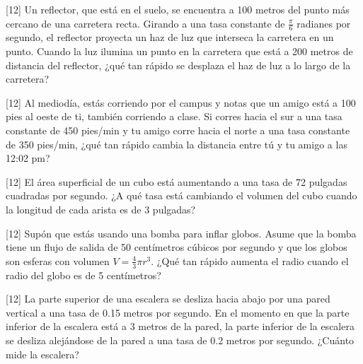 \documentclass[11pt,paper=a4,answers, addpoints]{exam}
\begin{document}
\begin{questions}
[12\half]
Un reflector, que está en el suelo, se encuentra a 100 metros del punto más cercano de una carretera recta. Girando a una tasa constante de $\frac{\pi}{6}$ radianes por segundo, el reflector proyecta un haz de luz que interseca la carretera en un punto. Cuando la luz ilumina un punto en la carretera que está a 200 metros de distancia del reflector, ¿qué tan rápido se desplaza el haz de luz a lo largo de la carretera?

[12\half]
Al mediodía, estás corriendo por el campus y notas que un amigo está a 100 pies al oeste de ti, también corriendo a clase. Si corres hacia el sur a una tasa constante de 450 pies/min y tu amigo corre hacia el norte a una tasa constante de 350 pies/min, ¿qué tan rápido cambia la distancia entre tú y tu amigo a las 12:02 pm?

[12\half]
El área superficial de un cubo está aumentando a una tasa de 72 pulgadas cuadradas por segundo. ¿A qué tasa está cambiando el volumen del cubo cuando la longitud de cada arista es de 3 pulgadas?

[12\half]
Supón que estás usando una bomba para inflar globos. Asume que la bomba tiene un flujo de salida de 50 centímetros cúbicos por segundo y que los globos son esferas con volumen $V=\frac{4}{3}\pi r^3$. ¿Qué tan rápido aumenta el radio cuando el radio del globo es de 5 centímetros?

[12\half]
La parte superior de una escalera se desliza hacia abajo por una pared vertical a una tasa de 0.15 metros por segundo. En el momento en que la parte inferior de la escalera está a 3 metros de la pared, la parte inferior de la escalera se desliza alejándose de la pared a una tasa de 0.2 metros por segundo. ¿Cuánto mide la escalera?

\end{questions}
\end{document}
